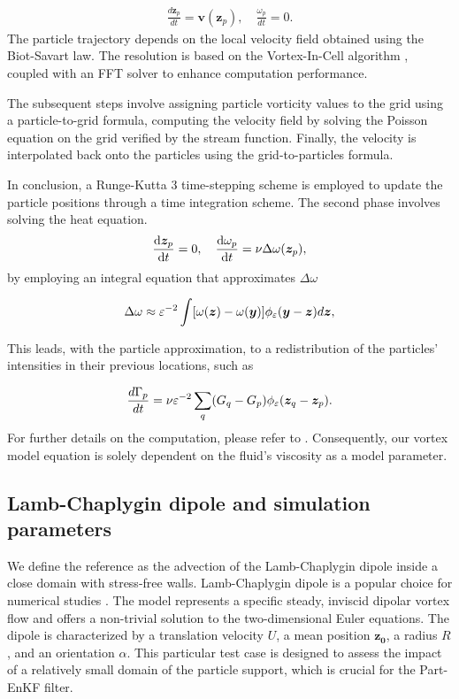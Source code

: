 \begin{eqnarray*}
	\frac{d\bm z_p}{dt} = \bm{v}(\bm z_p), \quad \frac{\omega_p}{dt} = 0.
\end{eqnarray*}The particle trajectory depends on the local velocity field obtained using the Biot-Savart law. The resolution is based on the Vortex-In-Cell algorithm \cite{christiansen_1973, birdsall_1969}, coupled with an FFT solver to enhance computation performance.

The subsequent steps involve assigning particle vorticity values to the grid using a particle-to-grid formula, computing the velocity field by solving the Poisson equation on the grid verified by the stream function. Finally, the velocity is interpolated back onto the particles using the grid-to-particles formula.

In conclusion, a Runge-Kutta 3 time-stepping scheme is employed to update the particle positions through a time integration scheme. The second phase involves solving the heat equation.
\begin{equation*}
	\frac{ \mathrm{d}\bm{z}_p}{ \mathrm{d}t} = 0, \quad	\frac{ \mathrm{d}\omega_p}{ \mathrm{d}t} = \nu \Delta \omega(\bm{z}_p),
\end{equation*}by employing an integral equation that approximates $\Delta \omega$

\begin{equation*}
	\Delta \omega \approx \varepsilon^{-2} \int [\omega(\bm{z})  - \omega(\bm{y})] \phi_\varepsilon(\bm{y} - \bm{z}) d\bm{z},
\end{equation*}

This leads, with the particle approximation, to a redistribution of the particles' intensities in their previous locations, such as

\begin{equation*}
	\frac{d\Gamma_p}{dt} = \nu \varepsilon^{-2} \sum_q (G_q - G_p) \phi_\varepsilon(\bm{z}_q - \bm{z}_p).
\end{equation*}
For further details on the computation, please refer to \cite{cottet_1990}. Consequently, our vortex model equation is solely dependent on the fluid's viscosity as a model parameter.


\subsection{Lamb-Chaplygin dipole and simulation parameters}

We define the reference as the advection of the Lamb-Chaplygin dipole inside a close domain with stress-free walls. Lamb-Chaplygin dipole is a popular choice for numerical studies \cite{orlandi_vortex_1990}. The model represents a specific steady, inviscid dipolar vortex flow and offers a non-trivial solution to the two-dimensional Euler equations. The dipole is characterized by a translation velocity $U$, a mean position $\bm{z_0}$, a radius $R$, and an orientation $\alpha$. This particular test case is designed to assess the impact of a relatively small domain of the particle support, which is crucial for the Part-EnKF filter.

